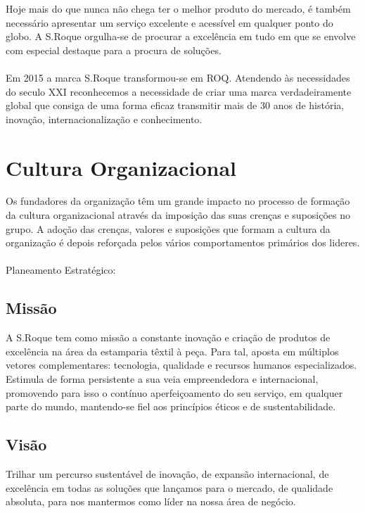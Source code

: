 Hoje mais do que nunca não chega ter o melhor produto do mercado, é também necessário apresentar um serviço excelente e acessível em qualquer ponto do globo. A S.Roque orgulha-se de procurar a excelência em tudo em que se envolve com especial destaque para a procura de soluções.\\
\\
Em 2015 a marca S.Roque transformou-se em ROQ. Atendendo às necessidades do seculo XXI reconhecemos a necessidade de criar uma marca verdadeiramente global que consiga de uma forma eficaz transmitir mais de 30 anos de história, inovação, internacionalização e conhecimento.
\newpage
\section{Cultura Organizacional}
\qquad Os fundadores da organização têm um grande impacto no processo de formação da cultura organizacional através da imposição das suas crenças e suposições no grupo. A adoção das crenças, valores e suposições que formam a cultura da organização é depois reforçada pelos vários comportamentos primários dos lideres.\\
\\
Planeamento Estratégico:
\subsection{Missão}
A S.Roque tem como missão a constante inovação e criação de produtos de excelência na área da estamparia têxtil à peça. Para tal, aposta em múltiplos vetores complementares: tecnologia, qualidade e recursos humanos especializados. Estimula de forma persistente a sua veia empreendedora e internacional, promovendo para isso o contínuo aperfeiçoamento do seu serviço, em qualquer parte do mundo, mantendo-se fiel aos princípios éticos e de sustentabilidade.
\subsection{Visão}
Trilhar um percurso sustentável de inovação, de expansão internacional, de excelência em todas as soluções que lançamos para o mercado, de qualidade absoluta, para nos mantermos como líder na nossa área de negócio.

